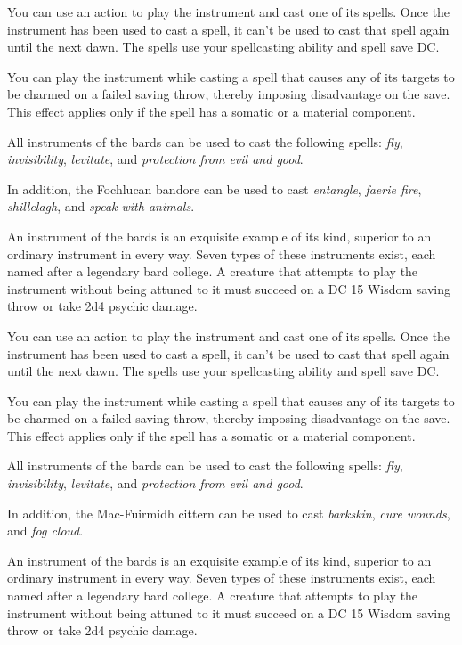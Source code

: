 \documentclass[10pt,a4paper,twoside,bg=print,twocolumn,openany,nodeprecatedcode]{dndbook}
\begin{document}
You can use an action to play the instrument and cast one of its spells. Once the instrument has been used to cast a spell, it can't be used to cast that spell again until the next dawn. The spells use your spellcasting ability and spell save DC.

You can play the instrument while casting a spell that causes any of its targets to be charmed on a failed saving throw, thereby imposing disadvantage on the save. This effect applies only if the spell has a somatic or a material component.

All instruments of the bards can be used to cast the following spells: \textit{fly}, \textit{invisibility}, \textit{levitate}, and \textit{protection from evil and good}.

In addition, the Fochlucan bandore can be used to cast \textit{entangle}, \textit{faerie fire}, \textit{shillelagh}, and \textit{speak with animals}.

An instrument of the bards is an exquisite example of its kind, superior to an ordinary instrument in every way. Seven types of these instruments exist, each named after a legendary bard college. A creature that attempts to play the instrument without being attuned to it must succeed on a DC 15 Wisdom saving throw or take 2d4 psychic damage.

You can use an action to play the instrument and cast one of its spells. Once the instrument has been used to cast a spell, it can't be used to cast that spell again until the next dawn. The spells use your spellcasting ability and spell save DC.

You can play the instrument while casting a spell that causes any of its targets to be charmed on a failed saving throw, thereby imposing disadvantage on the save. This effect applies only if the spell has a somatic or a material component.

All instruments of the bards can be used to cast the following spells: \textit{fly}, \textit{invisibility}, \textit{levitate}, and \textit{protection from evil and good}.

In addition, the Mac-Fuirmidh cittern can be used to cast \textit{barkskin}, \textit{cure wounds}, and \textit{fog cloud}.

An instrument of the bards is an exquisite example of its kind, superior to an ordinary instrument in every way. Seven types of these instruments exist, each named after a legendary bard college. A creature that attempts to play the instrument without being attuned to it must succeed on a DC 15 Wisdom saving throw or take 2d4 psychic damage.
\end{document}
